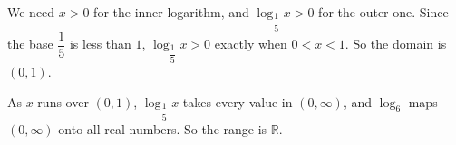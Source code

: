 We need $x>0$ for the inner logarithm, and $\log_{\dfrac15}x>0$ for the outer one. Since the base $\dfrac15$ is less than $1$, $\log_{\dfrac15}x>0$ exactly when $0<x<1$. So the domain is $\boxed{(0,1)}$.

As $x$ runs over $(0,1)$, $\log_{\dfrac15}x$ takes every value in $(0,\infty)$, and $\log_6$ maps $(0,\infty)$ onto all real numbers. So the range is $\boxed{\mathbb{R}}$.
